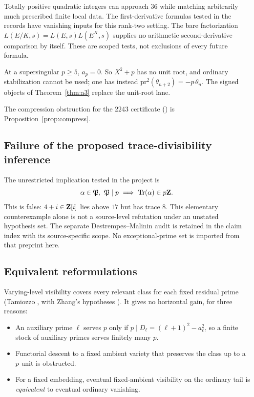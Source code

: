 \begin{obstruction}\label{obs:local}
Totally positive quadratic integers can approach $36$ while matching arbitrarily much prescribed finite local data. The first-derivative formulas tested in the records have vanishing inputs for this rank-two setting. The bare factorization $L(E/K,s)=L(E,s)L(E^K,s)$ supplies no arithmetic second-derivative comparison by itself. These are scoped tests, not exclusions of every future formula.
\end{obstruction}

\begin{obstruction}\label{obs:ssunit}
At a supersingular $p\ge5$, $a_p=0$. So $X^2+p$ has no unit root, and ordinary stabilization cannot be used; one has instead $\mathrm{pr}^2(\theta_{n+2})=-p\,\theta_n$. The signed objects of Theorem~\ref{thm:a3} replace the unit-root lane.
\end{obstruction}

The compression obstruction for the $2243$ certificate () is Proposition~\ref{prop:compress}.

\subsection{Failure of the proposed trace-divisibility inference}
\begin{obstruction}\label{obs:dm}
The unrestricted implication tested in the project is
\[
\alpha\in\mathfrak P,\ \mathfrak P\mid p\ \Longrightarrow\ \mathrm{Tr}(\alpha)\in p\mathbf{Z} .
\]
This is false: $4+i\in\mathbf{Z}[i]$ lies above $17$ but has trace $8$. This elementary counterexample alone is not a source-level refutation under an unstated hypothesis set. The separate Destrempes--Malinin audit is retained in the claim index with its source-specific scope. No exceptional-prime set is imported from that preprint here.
\end{obstruction}

\subsection{Equivalent reformulations}
\begin{researchrecord}\label{obs:vis}
Varying-level visibility covers every relevant class for each fixed residual prime (Tamiozzo \cite{tamiozzo}, with Zhang's hypotheses \cite{zhang}). It gives no horizontal gain, for three reasons:
\begin{itemize}[leftmargin=*]
\item An auxiliary prime $\ell$ serves $p$ only if $p\mid D_\ell=(\ell+1)^2-a_\ell^2$, so a finite stock of auxiliary primes serves finitely many $p$.
\item Functorial descent to a fixed ambient variety that preserves the class up to a $p$-unit is obstructed.
\item For a fixed embedding, eventual fixed-ambient visibility on the ordinary tail is \emph{equivalent} to eventual ordinary vanishing.
\end{itemize}
\end{researchrecord}

